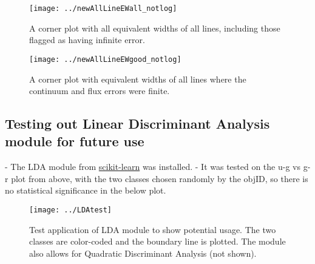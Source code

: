 \documentclass[12pt]{article}
\begin{document}
\begin{figure}
\texttt{[image: ../newAllLineEWall\_notlog]}\\
\caption{A corner plot with all equivalent widths of all lines, including those flagged as having infinite error.} 
\end{figure}
\begin{figure}
\texttt{[image: ../newAllLineEWgood\_notlog]}\\
\caption{A corner plot with equivalent widths of all lines where the continuum and flux errors were finite.} 
\end{figure}
\subsection{Testing out Linear Discriminant Analysis module for future use}
- The LDA module from \href{http://scikit-learn.org/stable/install.html}{scikit-learn} was installed.
- It was tested on the u-g vs g-r plot from above, with the two classes chosen randomly by the objID, so there is no statistical significance in the below plot.\\
\begin{figure}
\texttt{[image: ../LDAtest]}\\
\caption{Test application of LDA module to show potential usage. The two classes are color-coded and the boundary line is plotted. The module also allows for Quadratic Discriminant Analysis (not shown).}
\end{figure}
\end{document}
